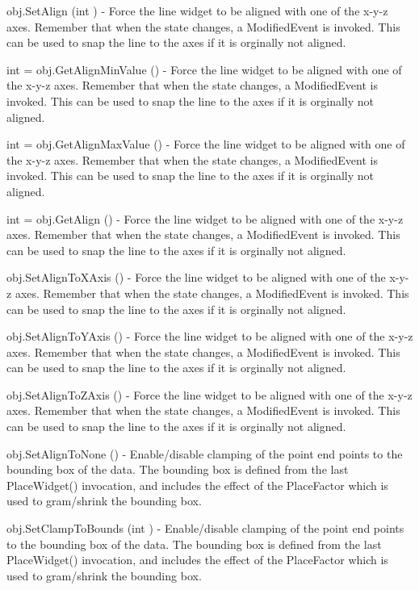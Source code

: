 \begin{DoxyItemize}
\item {\ttfamily obj.\-Set\-Align (int )} -\/ Force the line widget to be aligned with one of the x-\/y-\/z axes. Remember that when the state changes, a Modified\-Event is invoked. This can be used to snap the line to the axes if it is orginally not aligned.  
\item {\ttfamily int = obj.\-Get\-Align\-Min\-Value ()} -\/ Force the line widget to be aligned with one of the x-\/y-\/z axes. Remember that when the state changes, a Modified\-Event is invoked. This can be used to snap the line to the axes if it is orginally not aligned.  
\item {\ttfamily int = obj.\-Get\-Align\-Max\-Value ()} -\/ Force the line widget to be aligned with one of the x-\/y-\/z axes. Remember that when the state changes, a Modified\-Event is invoked. This can be used to snap the line to the axes if it is orginally not aligned.  
\item {\ttfamily int = obj.\-Get\-Align ()} -\/ Force the line widget to be aligned with one of the x-\/y-\/z axes. Remember that when the state changes, a Modified\-Event is invoked. This can be used to snap the line to the axes if it is orginally not aligned.  
\item {\ttfamily obj.\-Set\-Align\-To\-X\-Axis ()} -\/ Force the line widget to be aligned with one of the x-\/y-\/z axes. Remember that when the state changes, a Modified\-Event is invoked. This can be used to snap the line to the axes if it is orginally not aligned.  
\item {\ttfamily obj.\-Set\-Align\-To\-Y\-Axis ()} -\/ Force the line widget to be aligned with one of the x-\/y-\/z axes. Remember that when the state changes, a Modified\-Event is invoked. This can be used to snap the line to the axes if it is orginally not aligned.  
\item {\ttfamily obj.\-Set\-Align\-To\-Z\-Axis ()} -\/ Force the line widget to be aligned with one of the x-\/y-\/z axes. Remember that when the state changes, a Modified\-Event is invoked. This can be used to snap the line to the axes if it is orginally not aligned.  
\item {\ttfamily obj.\-Set\-Align\-To\-None ()} -\/ Enable/disable clamping of the point end points to the bounding box of the data. The bounding box is defined from the last Place\-Widget() invocation, and includes the effect of the Place\-Factor which is used to gram/shrink the bounding box.  
\item {\ttfamily obj.\-Set\-Clamp\-To\-Bounds (int )} -\/ Enable/disable clamping of the point end points to the bounding box of the data. The bounding box is defined from the last Place\-Widget() invocation, and includes the effect of the Place\-Factor which is used to gram/shrink the bounding box.  

\end{DoxyItemize}

